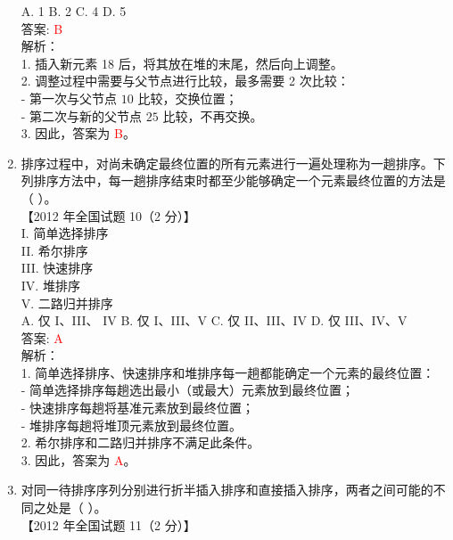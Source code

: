 \documentclass[lang=cn,newtx,10pt,scheme=chinese]{../../../elegantbook}
\begin{document}
\begin{enumerate}
    A. 1 \quad B. 2 \quad C. 4 \quad D. 5 \\

    答案: \textcolor{red}{B} \\

    解析：\\
    1. 插入新元素 18 后，将其放在堆的末尾，然后向上调整。\\
    2. 调整过程中需要与父节点进行比较，最多需要 2 次比较：\\
       - 第一次与父节点 $10$ 比较，交换位置；\\
       - 第二次与新的父节点 $25$ 比较，不再交换。\\
    3. 因此，答案为 \textcolor{red}{B}。\\

\item 排序过程中，对尚未确定最终位置的所有元素进行一遍处理称为一趟排序。下列排序方法中，每一趟排序结束时都至少能够确定一个元素最终位置的方法是（ ）。\\
    【2012 年全国试题 10（2 分）】\\

    I. 简单选择排序 \\  
    II. 希尔排序 \\  
    III. 快速排序 \\  
    IV. 堆排序 \\  
    V. 二路归并排序 \\  

    A. 仅 I、III、 IV \quad B. 仅 I、III、V \quad C. 仅 II、III、IV \quad D. 仅 III、IV、V \\

    答案: \textcolor{red}{A} \\

    解析：\\
    1. 简单选择排序、快速排序和堆排序每一趟都能确定一个元素的最终位置：\\
       - 简单选择排序每趟选出最小（或最大）元素放到最终位置；\\
       - 快速排序每趟将基准元素放到最终位置；\\
       - 堆排序每趟将堆顶元素放到最终位置。\\
    2. 希尔排序和二路归并排序不满足此条件。\\
    3. 因此，答案为 \textcolor{red}{A}。\\

\item 对同一待排序序列分别进行折半插入排序和直接插入排序，两者之间可能的不同之处是（ ）。\\
    【2012 年全国试题 11（2 分）】\\


\end{enumerate}
\end{document}

